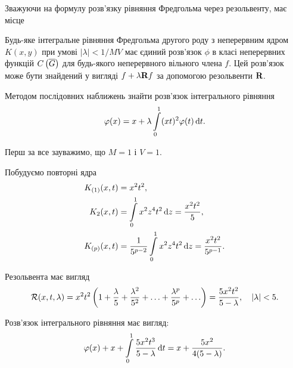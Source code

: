 Зважуючи на формулу розв'язку рівняння Фредгольма через резольвенту, має місце
\begin{theorem}
	Будь-яке інтегральне рівняння Фредгольма другого роду з неперервним ядром $K(x, y)$ при умові $|\lambda| < 1 / MV$ має єдиний розв'язок $\phi$ в класі неперервних функцій $\CoG$ для будь-якого неперервного вільного члена $f$. Цей розв'язок може бути знайдений у вигляді $f + \lambda \bf{R} f$ за допомогою резольвенти $\bf{R}$.
\end{theorem}

\newpage

\begin{example}
	Методом послідовних наближень знайти розв'язок інтегрального рівняння \begin{equation*}\phi(x) = x + \lambda \Int_0^1 (xt)^2 \phi(t) \diff t.\end{equation*}
\end{example}

\begin{solution}
	Перш за все зауважимо, що $M = 1$ і $V = 1$. \medskip

	Побудуємо повторні ядра 
	\begin{equation*}
		\begin{aligned} 
			K_{(1)}(x, t) &= x^2t^2, \\
			K_2(x, t) &= \Int_0^1 x^2 z^4 t^2 \diff z = \dfrac{x^2t^2}{5}, \\ 
			K_{(p)}(x, t) &= \dfrac{1}{5^{p - 2}} \Int_0^1 x^2 z^4 t^2 \diff z = \dfrac{x^2t^2}{5^{p - 1}}.
		\end{aligned}
	\end{equation*}
		
	Резольвента має вигляд 
	\begin{equation*}
		\cal{R}(x, t, \lambda) = x^2 t^2 \left(1 + \frac{\lambda}{5} + \frac{\lambda^2}{5^2} + \ldots + \frac{\lambda^p}{5^p} + \ldots \right) = \frac{5x^2t^2}{5 - \lambda}, \quad |\lambda| < 5.
	\end{equation*}

	Розв'язок інтегрального рівняння має вигляд: 
	\begin{equation*}
		\phi(x) + x + \Int_0^1 \dfrac{5x^2t^3}{5 - \lambda} \diff t = x + \dfrac{5x^2}{4(5 - \lambda)}.
	\end{equation*}
\end{solution}

